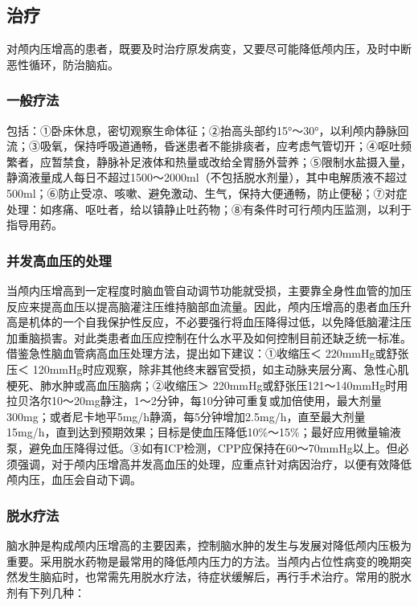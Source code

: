 \subsection{治疗}

对颅内压增高的患者，既要及时治疗原发病变，又要尽可能降低颅内压，及时中断恶性循环，防治脑疝。

\subsubsection{一般疗法}

包括：①卧床休息，密切观察生命体征；②抬高头部约15°～30°，以利颅内静脉回流；③吸氧，保持呼吸道通畅，昏迷患者不能排痰者，应考虑气管切开；④呕吐频繁者，应暂禁食，静脉补足液体和热量或改给全胃肠外营养；⑤限制水盐摄入量，静滴液量成人每日不超过1500～2000ml（不包括脱水剂量），其中电解质液不超过500ml；⑥防止受凉、咳嗽、避免激动、生气，保持大便通畅，防止便秘；⑦对症处理：如疼痛、呕吐者，给以镇静止吐药物；⑧有条件时可行颅内压监测，以利于指导用药。

\subsubsection{并发高血压的处理}

当颅内压增高到一定程度时脑血管自动调节功能就受损，主要靠全身性血管的加压反应来提高血压以提高脑灌注压维持脑部血流量。因此，颅内压增高的患者血压升高是机体的一个自我保护性反应，不必要强行将血压降得过低，以免降低脑灌注压加重脑损害。对此类患者血压应控制在什么水平及如何控制目前还缺乏统一标准。借鉴急性脑血管病高血压处理方法，提出如下建议：①收缩压＜
220mmHg或舒张压＜
120mmHg时应观察，除非其他终末器官受损，如主动脉夹层分离、急性心肌梗死、肺水肿或高血压脑病；②收缩压＞
220mmHg或舒张压121～140mmHg时用拉贝洛尔10～20mg静注，1～2分钟，每10分钟可重复或加倍使用，最大剂量300mg；或者尼卡地平5mg/h静滴，每5分钟增加2.5mg/h，直至最大剂量15mg/h，直到达到预期效果；目标是使血压降低10\%～15\%；最好应用微量输液泵，避免血压降得过低。③如有ICP检测，CPP应保持在60～70mmHg以上。但必须强调，对于颅内压增高并发高血压的处理，应重点针对病因治疗，以便有效降低颅内压，血压会自动下调。

\subsubsection{脱水疗法}

脑水肿是构成颅内压增高的主要因素，控制脑水肿的发生与发展对降低颅内压极为重要。采用脱水药物是最常用的降低颅内压力的方法。当颅内占位性病变的晚期突然发生脑疝时，也常需先用脱水疗法，待症状缓解后，再行手术治疗。常用的脱水剂有下列几种：

